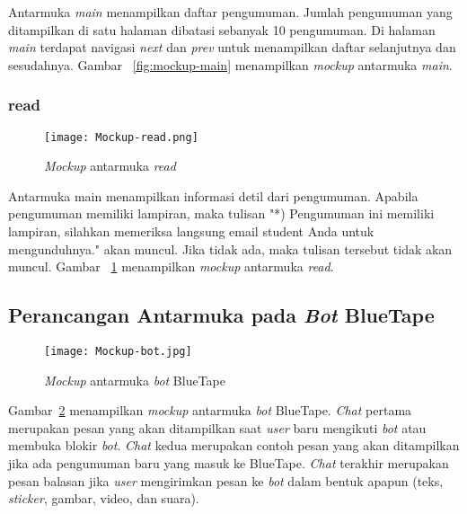 Antarmuka \textit{main} menampilkan daftar pengumuman. Jumlah pengumuman yang ditampilkan di satu halaman dibatasi sebanyak 10 pengumuman. Di halaman \textit{main} terdapat navigasi \textit{next} dan \textit{prev} untuk menampilkan daftar selanjutnya dan sesudahnya. Gambar~ \ref{fig:mockup-main} menampilkan \textit{mockup} antarmuka \textit{main}.

\subsubsection{read}

\begin{figure}[H]
	\centering  
	\texttt{[image: Mockup-read.png]}  
	\caption[\textit{Mockup} antarmuka \textit{read}]{\textit{Mockup} antarmuka \textit{read}} 
	\label{fig:mockup-read} 
\end{figure}

Antarmuka main menampilkan informasi detil dari pengumuman. Apabila pengumuman memiliki lampiran, maka tulisan "*) Pengumuman ini memiliki lampiran, silahkan memeriksa langsung email student Anda untuk mengunduhnya." akan muncul. Jika tidak ada, maka tulisan tersebut tidak akan muncul. Gambar~ \ref{fig:mockup-read} menampilkan \textit{mockup} antarmuka \textit{read}.

\subsection{Perancangan Antarmuka pada \textit{Bot} BlueTape}

\begin{figure}[H]
	\centering  
	\texttt{[image: Mockup-bot.jpg]}  
	\caption[\textit{Mockup} antarmuka \textit{bot} BlueTape]{\textit{Mockup} antarmuka \textit{bot} BlueTape} 
	\label{fig:mockup-bot} 
\end{figure}

Gambar~\ref{fig:mockup-bot} menampilkan \textit{mockup} antarmuka \textit{bot} BlueTape. \textit{Chat} pertama merupakan pesan yang akan ditampilkan saat \textit{user} baru mengikuti \textit{bot} atau membuka blokir \textit{bot}. \textit{Chat} kedua merupakan contoh pesan yang akan ditampilkan jika ada pengumuman baru yang masuk ke BlueTape. \textit{Chat} terakhir merupakan pesan balasan jika \textit{user} mengirimkan pesan ke \textit{bot} dalam bentuk apapun (teks, \textit{sticker}, gambar, video, dan suara).